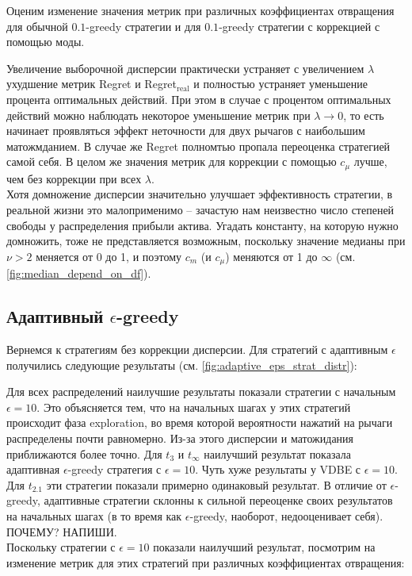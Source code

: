\documentclass{article}
\begin{document}
Оценим изменение значения метрик при различных коэффициентах отвращения для обычной $0.1$-greedy стратегии и для $0.1$-greedy стратегии с коррекцией с помощью моды.

Увеличение выборочной дисперсии практически устраняет с увеличением $\lambda$ ухудшение метрик Regret и Regret$_\text{real}$ и полностью устраняет уменьшение процента оптимальных действий. При этом в случае с процентом оптимальных действий можно наблюдать некоторое уменьшение метрик при $\lambda \to 0$, то есть начинает проявляться эффект неточности для двух рычагов с наибольшим матожмданием. В случае же Regret полномтью пропала переоценка стратегией самой себя. В целом же значения метрик для коррекции с помощью $c_{\mu}$ лучше, чем без коррекции при всех $\lambda$. \\

Хотя домножение дисперсии значительно улучшает эффективность стратегии, в реальной жизни это малоприменимо -- зачастую нам неизвестно число степеней свободы у распределения прибыли актива. Угадать константу, на которую нужно домножить, тоже не представляется возможным, поскольку значение медианы при $\nu > 2$ меняется от 0 до 1, и поэтому $c_m$ (и $c_{\mu}$) меняются от 1 до $\infty$ (см. \ref{fig:median_depend_on_df}).

\subsection{Адаптивный $\epsilon$-greedy}

Вернемся к стратегиям без коррекции дисперсии. Для стратегий с адаптивным $\epsilon$ получились следующие результаты (см. \ref{fig:adaptive_eps_strat_distr}):

Для всех распределений наилучшие результаты показали стратегии с начальным $\epsilon=10$. Это объясняется тем, что на начальных шагах у этих стратегий происходит фаза exploration, во время которой вероятности нажатий на рычаги распределены почти равномерно. Из-за этого дисперсии и матожидания приближаются более точно. Для $t_3$ и $t_{\infty}$ наилучший результат показала адаптивная $\epsilon$-greedy стратегия с $\epsilon=10$. Чуть хуже результаты у VDBE с $\epsilon=10$. Для $t_{2.1}$ эти стратегии показали примерно одинаковый результат. В отличие от $\epsilon$-greedy, адаптивные стратегии склонны к сильной переоценке своих результатов на начальных шагах (в то время как $\epsilon$-greedy, наоборот, недооценивает себя). ПОЧЕМУ? НАПИШИ. \\

Поскольку стратегии с $\epsilon=10$ показали наилучший результат, посмотрим на изменение метрик для этих стратегий при различных коэффициентах отвращения:
\end{document}
